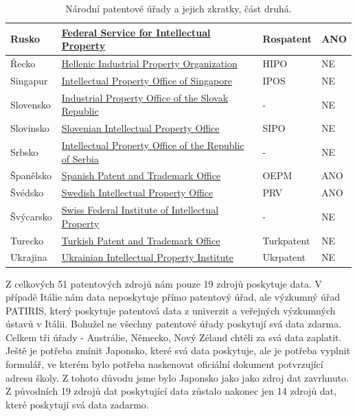 \begin{table}[H]
\begin{tabular}{|>{\centering\arraybackslash}p{2.2cm}|>{\centering\arraybackslash}p{7.5cm}|>{\centering\arraybackslash}p{2cm}|>{\centering\arraybackslash}p{1cm}|}
	\hline
	Rusko & \href{https://rospatent.gov.ru/}{Federal Service for Intellectual Property}  & Rospatent   & ANO      \\ 
	\hline
	Řecko & \href{http://www.obi.gr/el/}{Hellenic Industrial Property Organization}  & HIPO   & NE      \\ 
	\hline
	Singapur & \href{http://www.ipos.gov.sg/}{Intellectual Property Office of Singapore}  & IPOS    & NE     \\ 
	\hline
	Slovensko & \href{https://www.indprop.gov.sk/}{Industrial Property Office of the Slovak Republic}  & -     & NE    \\ 
	\hline
	Slovinsko & \href{http://www.uil-sipo.si/}{Slovenian Intellectual Property Office}  & SIPO   & NE      \\ 
	\hline
	Srbsko & \href{http://www.zis.gov.rs/}{Intellectual Property Office of the Republic of Serbia}  & -   & NE      \\ 
	\hline
	Španělsko & \href{http://www.oepm.es/}{Spanish Patent and Trademark Office}  & OEPM   & ANO      \\ 
	\hline
	Švédsko & \href{http://www.prv.se/}{Swedish Intellectual Property Office}  & PRV   & ANO      \\ 
	\hline
	Švýcarsko & \href{https://www.ige.ch/}{Swiss Federal Institute of Intellectual Property}  & -     & NE    \\ 
	\hline
	Turecko & \href{http://www.turkpatent.gov.tr/}{Turkish Patent and Trademark Office}  & Turkpatent   & NE      \\ 
	\hline
	Ukrajina & \href{https://ukrpatent.org/en}{Ukrainian Intellectual Property Institute}  & Ukrpatent    & NE     \\ 
	\hline
	\end{tabular}
	\caption{Národní patentové úřady a jejich zkratky, část druhá.}
	\label{tab:table_offices2}
	\end{table}
\newpage

\noindent Z celkových 51 patentových zdrojů nám pouze 19 zdrojů poskytuje data. V případě Itálie nám data neposkytuje přímo patentový úřad, ale výzkumný úřad PATIRIS, který poskytuje patentová data z univerzit a veřejných výzkumných ústavů v Itálii. 
\newline
\indent Bohužel ne všechny patentové úřady poskytují svá data zdarma. Celkem tři úřady - Austrálie, Německo, Nový Zéland chtěli za svá data zaplatit. 
\newline
\indent Ještě je potřeba zmínit Japonsko, které svá data poskytuje, ale je potřeba vyplnit formulář, ve kterém bylo potřeba naskenovat oficiální dokument potvrzující adresu školy. Z tohoto důvodu jsme bylo Japonsko jako jako zdroj dat zavrhnuto. Z původních 19 zdrojů dat poskytující data zůstalo nakonec jen 14 zdrojů dat, které poskytují svá data zadarmo.

